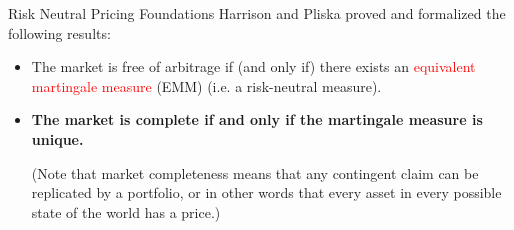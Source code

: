 \documentclass{beamer}
\begin{document}
\begin{frame}{Risk Neutral Pricing Foundations}
	Harrison and Pliska proved and formalized the following results:
	\begin{itemize}
		\item The market is free of arbitrage if (and only if) there exists an \textcolor{red}{equivalent martingale measure} (EMM) (i.e. a risk-neutral measure).
		\item \textbf{The market is complete if and only if the martingale measure is unique.}
		
		(Note that market completeness means that any contingent claim can be replicated by a portfolio, or in other words that every asset in every possible state of the world has a price.)
	\end{itemize}
	\vfill
\end{frame}




\end{document}
